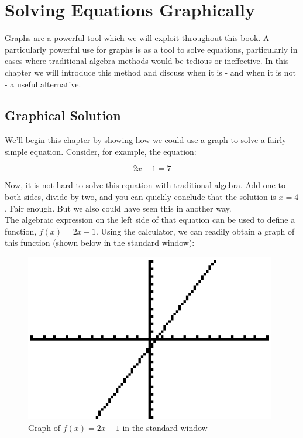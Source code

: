 
%
%

\section{Solving Equations Graphically}
\label{SolvingEquationsGraphically}

Graphs are a powerful tool which we will exploit throughout this book. A particularly powerful use for graphs is as a tool to solve equations, particularly in cases where traditional algebra methods would be tedious or ineffective. In this chapter we will introduce this method and discuss when it is - and when it is not - a useful alternative.

%
%

\subsection{Graphical Solution}

We’ll begin this chapter by showing how we could use a graph to solve a fairly simple equation.
Consider, for example, the equation:

\begin{equation*}
	2x-1=7
\end{equation*}

Now, it is not hard to solve this equation with traditional algebra. Add one to both sides, divide by two, and you can quickly conclude that the solution is $x=4$. Fair enough. But we also could have seen this in another way.\\

The algebraic expression on the left side of that equation can be used to define a function, $f(x)=2x-1$. Using the calculator, we can readily obtain a graph of this function (shown below in the standard window):

\begin{figure}[H]
	\centering
	\includegraphics[scale=1.0]{Sections/SolvingEquationsGraphically/Figure01.png}
	\caption{Graph of $f(x)=2x-1$ in the standard window}
\end{figure}


